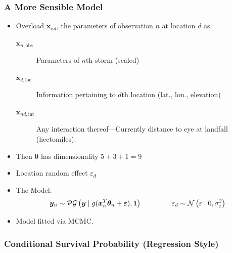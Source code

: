 \documentclass[aspectratio=169,10pt]{beamer}
\begin{document}
\begin{frame}
    \frametitle{A More Sensible Model}
    \begin{itemize}
        \item Overload $\bm{x}_{nd}$, the parameters of observation $n$ at location $d$ as
        \begin{description}
            \item[$\bm{x}_{n,\text{obs}}$] Parameters of $n$th storm (scaled)
            \item[$\bm{x}_{d,\text{loc}}$] Information pertaining to $d$th location 
                (lat., lon., elevation)
            \item[$\bm{x}_{nd,\text{int}}$] Any interaction thereof---Currently 
                distance to eye at landfall (hectomiles).
        \end{description}
        \item Then $\bm{\theta}$ has dimensionality $5 + 3 + 1 = 9$
        \item Location random effect $\varepsilon_d$
        \item The Model:
        \[
            \bm{y}_n \sim \mathcal{PG}\left(\bm{y}\mid g(\bm{x}_n^T\bm{\theta}_n 
                + \bm{\varepsilon}), \bm{1}\right)
            \hspace{1.5cm}
            \varepsilon_d \sim \mathcal{N}\left(\varepsilon\mid 0, 
                \sigma_{\varepsilon}^2\right)
        \]
        \item Model fitted via MCMC.
    \end{itemize}
\end{frame} %

\subsubsection{Conditional Survival Probability (Regression Style)}
\end{document}
